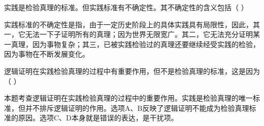 \question 实践是检验真理的标准。但实践标准有不确定性。其不确定性的含义包括（ ）
\par{}
\begin{solution}实践标准的不确定性是指，由于一定历史阶段上的具体实践具有局限性，因此，其一，它无法一下子证明所有的真理；因为世界无限宽广。其二，它无法充分证明某一真理，因为事物复杂；其三，已被实践检验过的真理还要继续经受实践的检验，因为事物在不断发展变化。
\end{solution}
\question 逻辑证明在实践检验真理的过程中有重要作用，但不是检验真理的标准，这是因为（
）
\par{}
\begin{solution}本题考查逻辑证明在实践检验真理的过程中的重要作用。实践是检验真理的唯一标准，但并不排斥逻辑证明的作用。选项A、B反映了逻辑证明不能成为检验真理标准的原因。选项C、D本身就是错误的表达，是干扰项。
\end{solution}

